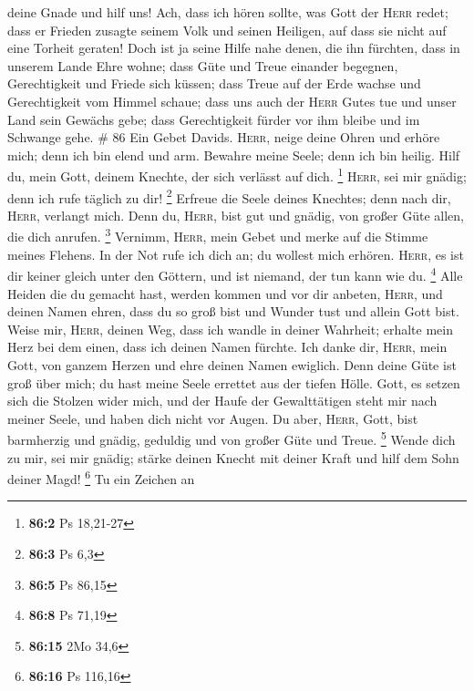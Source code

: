 deine Gnade und hilf uns!  Ach, dass ich hören sollte, was
Gott der \textsc{Herr} redet; dass er Frieden zusagte seinem Volk und
seinen Heiligen, auf dass sie nicht auf eine Torheit geraten!
 Doch ist ja seine Hilfe nahe denen, die ihn fürchten,
dass in unserem Lande Ehre wohne;  dass Güte und Treue
einander begegnen, Gerechtigkeit und Friede sich küssen; 
dass Treue auf der Erde wachse und Gerechtigkeit vom Himmel schaue;
 dass uns auch der \textsc{Herr} Gutes tue und unser Land
sein Gewächs gebe;  dass Gerechtigkeit fürder vor ihm
bleibe und im Schwange gehe. \# 86  Ein Gebet Davids.
\textsc{Herr}, neige deine Ohren und erhöre mich; denn ich bin elend und
arm.  Bewahre meine Seele; denn ich bin heilig. Hilf du,
mein Gott, deinem Knechte, der sich verlässt auf dich. \footnote{\textbf{86:2}
  Ps 18,21-27}  \textsc{Herr}, sei mir gnädig; denn ich
rufe täglich zu dir! \footnote{\textbf{86:3} Ps 6,3} 
Erfreue die Seele deines Knechtes; denn nach dir, \textsc{Herr},
verlangt mich.  Denn du, \textsc{Herr}, bist gut und
gnädig, von großer Güte allen, die dich anrufen. \footnote{\textbf{86:5}
  Ps 86,15}  Vernimm, \textsc{Herr}, mein Gebet und merke
auf die Stimme meines Flehens.  In der Not rufe ich dich
an; du wollest mich erhören.  \textsc{Herr}, es ist dir
keiner gleich unter den Göttern, und ist niemand, der tun kann wie du.
\footnote{\textbf{86:8} Ps 71,19}  Alle Heiden die du
gemacht hast, werden kommen und vor dir anbeten, \textsc{Herr}, und
deinen Namen ehren,  dass du so groß bist und Wunder tust
und allein Gott bist.  Weise mir, \textsc{Herr}, deinen
Weg, dass ich wandle in deiner Wahrheit; erhalte mein Herz bei dem
einen, dass ich deinen Namen fürchte.  Ich danke dir,
\textsc{Herr}, mein Gott, von ganzem Herzen und ehre deinen Namen
ewiglich.  Denn deine Güte ist groß über mich; du hast
meine Seele errettet aus der tiefen Hölle.  Gott, es
setzen sich die Stolzen wider mich, und der Haufe der Gewalttätigen
steht mir nach meiner Seele, und haben dich nicht vor Augen.
 Du aber, \textsc{Herr}, Gott, bist barmherzig und
gnädig, geduldig und von großer Güte und Treue. \footnote{\textbf{86:15}
  2Mo 34,6}  Wende dich zu mir, sei mir gnädig; stärke
deinen Knecht mit deiner Kraft und hilf dem Sohn deiner Magd!
\footnote{\textbf{86:16} Ps 116,16}  Tu ein Zeichen an

